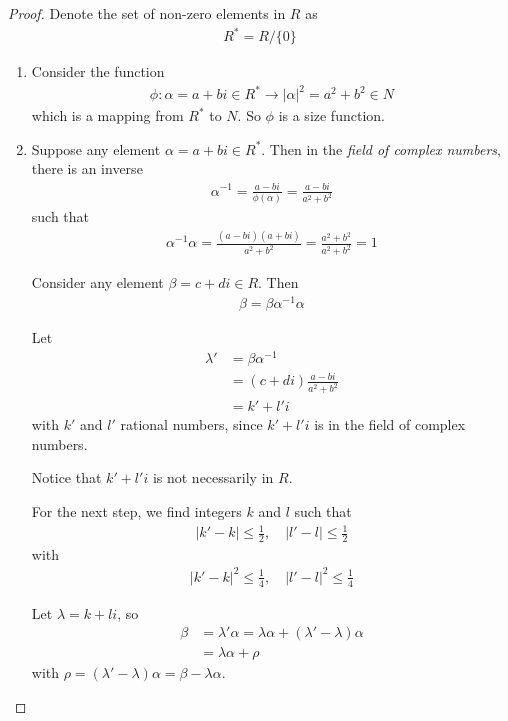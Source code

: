 \documentclass[utf8]{ctexbook}
\begin{document}
\begin{proof}
Denote the set of non-zero elements in $R$ as
\begin{align*}
R^*= R / \{ 0\}
\end{align*}
\begin{enumerate}
\item{Consider the function
\begin{align*}
\phi: \alpha = a + bi \in R^* \longrightarrow |\alpha|^2 = a^2 + b^2 \in N
\end{align*}
which is a mapping from $R^* $ to $N$. So $\phi$ is a size function.
}
\item{Suppose any element $\alpha = a + bi \in R^*$. Then in the \emph{field of complex numbers}, there is an inverse
\begin{align*}
\alpha^{-1} = \frac{a-bi}{\phi(\alpha) } = \frac{a - b i}{a^2 + b^2}
\end{align*}
such that
\begin{align*}
\alpha^{-1} \alpha = \frac{(a - b i)(a + b i)}{a^2 + b^2} = \frac{a^2 + b^2}{a^2 + b^2} = 1
\end{align*}

Consider any element $\beta = c + di \in R$. Then 
\begin{align*}
\beta = \beta \alpha^{-1} \alpha 
\end{align*}

Let
\begin{align*}
\lambda' &= \beta \alpha^{-1} \\
&= (c+ di) \frac{a - b i}{a^2 + b^2} \\
&= k' + l' i
\end{align*}
with $k'$ and $l'$ rational numbers, since $k' + l' i$ is in the field of complex numbers.

Notice that $k' + l' i$ is not necessarily in $R$.

For the next step, we find integers $k$ and $l$ such that
\begin{align*}
| k' - k | \leq \frac{1}{2}, \quad | l' - l | \leq \frac{1}{2}
\end{align*}
with
\begin{align*}
| k' - k |^2 \leq \frac{1}{4}, \quad | l' - l |^2 \leq \frac{1}{4}
\end{align*}

Let $\lambda = k + l i$, so
\begin{align*}
\beta & = \lambda' \alpha = \lambda \alpha + (\lambda' - \lambda) \alpha \\
& = \lambda \alpha + \rho
\end{align*}
with $\rho = (\lambda' - \lambda) \alpha = \beta - \lambda \alpha$.

}
\end{enumerate}
\end{proof}
\end{document}
